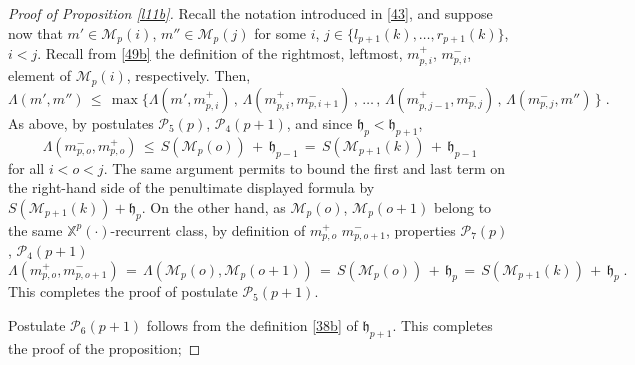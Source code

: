 \documentclass[reqno]{amsart}
\theoremstyle{plain}
\theoremstyle{definition}
\newcommand{\mc}[1]{{\mathcal #1}}
\newcommand{\mf}[1]{{\mathfrak #1}}
\newcommand{\bb}[1]{{\mathbb #1}}
\newcommand{\ms}[1]{{\mathscr #1}}
\newcounter{as}[section]
\newcommand{\<}{\langle}
\renewcommand{\>}{\rangle}
\begin{document}
\begin{proof}[Proof of Proposition \ref{l11b}]
Recall the notation introduced in \eqref{43}, and suppose now that
$m' \in \ms M_{p}(i) $, $m'' \in \ms M_{p}(j) $ for some $i$,
$j \in \{l_{p+1}(k), \dots, r_{p+1} (k)\}$, $i<j$. Recall from
\eqref{49b} the definition of the rightmost, leftmost, $m^+_{p,i}$,
$m^-_{p,i}$, element of $\ms M_{p}(i)$, respectively.  Then,
\begin{equation*}
\Lambda (m',m'') \,\le \,
\max \Big\{ \Lambda (m', m^+_{p,i}) \,,\,
\Lambda (m^+_{p,i}, m^-_{p,i+1}) \,,\,
\dots \,,\,
\Lambda (m^+_{p,j-1}, m^-_{p,j}) \,,\,
\Lambda (m^-_{p,j}, m'') \, \Big\}\;.
\end{equation*}
As above, by postulates $\mc P_5(p)$, $\mc P_{4}(p+1)$, and since $\mf
h_p < \mf h_{p+1}$, 
\begin{equation*}
\Lambda (m^-_{p,o}, m^+_{p,o}) \,\le\,  S(\ms M_{p}(o) ) \,+\, \mf
h_{p-1} \,=\,  S(\ms M_{p+1}(k) ) \,+\,  \mf h_{p-1} 
\end{equation*}
for all $i<o<j$. The same argument permits to bound the first and last
term on the right-hand side of the penultimate displayed formula by
$S(\ms M_{p+1}(k) ) + \mf h_{p}$. On the other hand, as $\ms M_p(o)$,
$\ms M_p(o+1)$ belong to the same $\bb X^p(\cdot)$-recurrent class, by
definition of $m^+_{p,o}$ $m^-_{p,o+1}$, properties $\mc P_7(p)$,
$\mc P_{4}(p+1)$ 
\begin{equation*}
\Lambda (m^+_{p,o}, m^-_{p,o+1}) \,=\,
\Lambda ( \ms M _p(o), \ms M _p(o+1)) \,=\,
S(\ms M_{p}(o) ) \,+\, \mf h_p
\,=\,
S(\ms M_{p+1}(k) ) \,+\, \mf h_p \;. 
\end{equation*}
This completes the proof of postulate $\mc P_5(p+1)$.

Postulate $\mc P_6(p+1)$ follows from the definition \eqref{38b} of
$\mf h_{p+1}$.  This completes the proof of the proposition;
\end{proof}
\end{document}
